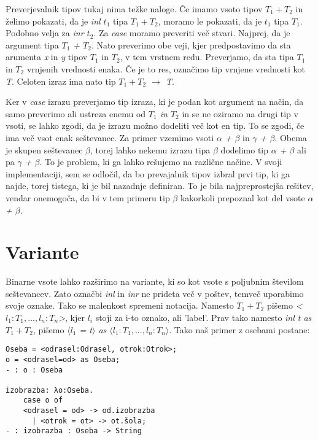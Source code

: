 \documentclass[12pt,a4paper,openany]{book}
\begin{document}
Preverjevalnik tipov tukaj nima težke naloge. Če imamo vsoto tipov \(T_1 + T_2\) in želimo pokazati, da je \emph{inl $t_1$} tipa \emph{$T_1 + T_2$}, moramo le pokazati, da je 
\emph{$t_1$} tipa \emph{$T_1$}. Podobno velja za \emph{inr $t_2$}. Za \emph{case} moramo preveriti več stvari. Najprej, da je argument tipa \emph{$T_1$ + $T_2$}. Nato preverimo 
obe veji, kjer predpostavimo da sta arumenta \emph{x} in \emph{y} tipov \emph{$T_1$} in \emph{$T_2$}, v tem vrstnem redu. Preverjamo, da sta tipa \emph{$T_1$} in \emph{$T_2$} 
vrnjenih vrednosti enaka. Če je to res, označimo tip vrnjene vrednosti kot \emph{T}. Celoten izraz ima nato tip \emph{$T_1 + T_2$ $\rightarrow$ T}.

Ker v \emph{case} izrazu preverjamo tip izraza, ki je podan kot argument na način, da samo preverimo ali ustreza enemu od \emph{\(T_1\) in \(T_2\)} in se ne oziramo na drugi tip v vsoti, 
se lahko zgodi, da je izrazu možno dodeliti več kot en tip. To se zgodi, če ima več vsot enak seštevanec. Za primer vzemimo vsoti \emph{$\alpha$ + $\beta$} in \emph{$\gamma$ + $\beta$}.
Obema je skupen seštevanec \emph{$\beta$}, torej lahko nekemu izrazu tipa \emph{$\beta$} dodelimo tip \emph{$\alpha$ + $\beta$} ali pa \emph{$\gamma$ + $\beta$}. To je problem, ki ga
lahko rešujemo na različne načine. V svoji implementaciji, sem se odločil, da bo prevajalnik tipov izbral prvi tip, ki ga najde, torej tistega, ki je bil nazadnje definiran. To je bila 
najpreprostejša rešitev, vendar onemogoča, da bi v tem primeru tip \emph{$\beta$} kakorkoli prepoznal kot del vsote \emph{$\alpha$ + $\beta$}.

\section{Variante}
Binarne vsote lahko razširimo na variante, ki so kot vsote s poljubnim številom seštevancev. Zato označbi \emph{inl} in \emph{inr} ne prideta več v poštev, temveč uporabimo svoje oznake. 
Tako se malenkost spremeni notacija. Namesto \emph{$T_1 + T_2$} pišemo \emph{<$l_1:T_1, ... , l_n:T_n$>}, kjer \(l_i\) stoji za i-to oznako, ali 'label'. Prav tako namesto \emph{inl t as 
$T_1 + T_2$}, pišemo \emph{$\langle l_1$ = t$\rangle$ as $\langle l_1:T_1, ... , l_n:T_n\rangle$}. Tako naš primer z osebami postane:
\begin{lstlisting}
Oseba = <odrasel:Odrasel, otrok:Otrok>;
o = <odrasel=od> as Oseba;
- : o : Oseba

izobrazba: λo:Oseba.
    case o of
    <odrasel = od> -> od.izobrazba
      | <otrok = ot> -> ot.šola;
- : izobrazba : Oseba -> String
\end{lstlisting}
\end{document}
